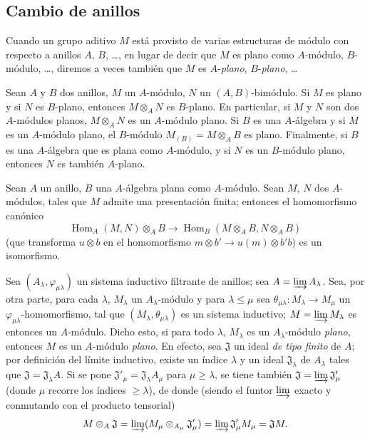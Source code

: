 \subsection{Cambio de anillos}
\label{subsection:0.6.2-fr}

Cuando un grupo aditivo $M$ está provisto de varias estructuras de módulo con
respecto a anillos $A$, $B$, \ldots, en lugar de decir que $M$ es plano
como $A$-módulo, $B$-módulo, \ldots, diremos a veces también que $M$
es $A$-\emph{plano}, $B$-\emph{plano}, \ldots

\begin{env}[6.2.1]
\label{0.6.2.1-fr}
Sean $A$ y $B$ dos anillos, $M$ un $A$-módulo, $N$ un
$(A,B)$-bimódulo. Si $M$ es plano y si $N$ es $B$-plano, entonces
$M\otimes_A N$ es $B$-plano. En particular, si $M$ y $N$ son dos
$A$-módulos planos, $M\otimes_A N$ es un $A$-módulo plano. Si $B$ es una
$A$-álgebra y si $M$ es
un $A$-módulo plano, el $B$-módulo $M_{(B)}=M\otimes_A B$ es plano. Finalmente, si
$B$ es una $A$-álgebra que es plana como $A$-módulo, y si $N$ es
un $B$-módulo plano, entonces $N$ es también $A$-plano.
\end{env}

\begin{env}[6.2.2]
\label{0.6.2.2-fr}
Sean $A$ un anillo, $B$ una $A$-álgebra plana como $A$-módulo.
Sean $M$, $N$ dos $A$-módulos, tales que $M$ admite una presentación
finita; entonces el homomorfismo canónico
\[
  \operatorname{Hom}_A(M,N)\otimes_A B
  \longrightarrow
  \operatorname{Hom}_B(M\otimes_A B,N\otimes_A B)
  \tag{6.2.2.1}
\]
(que transforma $u\otimes b$ en el homomorfismo
$m\otimes b'\to u(m)\otimes b'b$) es un isomorfismo.
\end{env}

\begin{env}[6.2.3]
\label{0.6.2.3-fr}
Sea $(A_\lambda,\varphi_{\mu\lambda})$ un sistema inductivo filtrante
de anillos; sea $A=\varinjlim A_\lambda$. Sea, por otra parte, para cada
$\lambda$, $M_\lambda$ un $A_\lambda$-módulo y para $\lambda\leq\mu$ sea
$\theta_{\mu\lambda}:M_\lambda\to M_\mu$ un
$\varphi_{\mu\lambda}$-homomorfismo, tal que
$(M_\lambda,\theta_{\mu\lambda})$ es un sistema inductivo;
$M=\varinjlim M_\lambda$ es entonces un $A$-módulo. Dicho esto, si para todo
$\lambda$, $M_\lambda$ es un $A_\lambda$-módulo \emph{plano}, entonces $M$ es
un $A$-módulo \emph{plano}. En efecto, sea $\mathfrak{J}$ un ideal \emph{de
tipo finito} de $A$; por definición del límite inductivo, existe un
índice $\lambda$ y un ideal $\mathfrak{J}_\lambda$ de $A_\lambda$ tales que
$\mathfrak{J}=\mathfrak{J}_\lambda A$. Si se pone
$\mathfrak{J}'_\mu=\mathfrak{J}_\lambda A_\mu$ para $\mu\geq\lambda$, se tiene
también $\mathfrak{J}=\varinjlim\mathfrak{J}'_\mu$ (donde $\mu$ recorre los
índices $\geq\lambda$), de donde (siendo el funtor $\varinjlim$ exacto y
conmutando con el producto tensorial)
\[
  M\otimes_A\mathfrak{J}
  =\varinjlim(M_\mu\otimes_{A_\mu}\mathfrak{J}'_\mu)
  =\varinjlim\mathfrak{J}'_\mu M_\mu
  =\mathfrak{J}M.
\]
\end{env}

